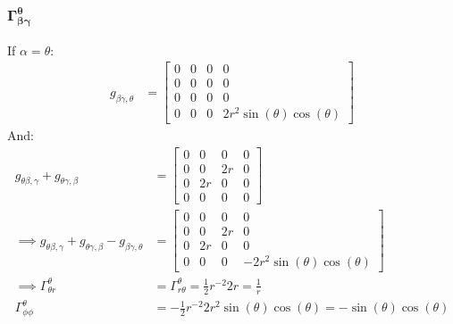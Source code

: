 \documentclass[a4paper]{article}
\begin{document}
\subsubsection{$\boldsymbol{\Gamma^\theta_{\beta \gamma}}$}
If $\alpha = \theta$:
\begin{align*}
	g_{\beta\gamma,\theta} &= \begin{bmatrix} 0 & 0  & 0 & 0 \\
				0 &0 & 0 & 0\\
				0 & 0 & 0 & 0  \\
				0 & 0 & 0 & 2r^2 \sin(\theta) \cos(\theta)
			\end{bmatrix}
\end{align*}
And:
\begin{align*}
	g_{\theta\beta , \gamma} + g_{\theta \gamma , \beta} &= \begin{bmatrix} 0 & 0 & 0 & 0 \\
		0 & 0 & 2r & 0\\
		0 & 2r & 0 & 0 \\
		0 & 0 & 0 & 0
\end{bmatrix}\\
\implies 	g_{\theta\beta , \gamma} + g_{\theta \gamma , \beta} - g_{\beta\gamma,\theta} &= \begin{bmatrix} 0 & 0 & 0 & 0 \\
	0 & 0 & 2r & 0\\
	0 & 2r & 0 & 0 \\
	0 & 0 & 0 & -2r^2 \sin(\theta) \cos(\theta)
\end{bmatrix}\\
\implies \Gamma^\theta _{\theta r} &= \Gamma^\theta _{r \theta} = \frac{1}{2} r^{-2} 2r = \frac{1}{r}\\
\Gamma^\theta _{\phi \phi} &= -\frac{1}{2} r^{-2} 2r^2\sin(\theta)\cos(\theta) = -\sin(\theta) \cos(\theta)
\end{align*}
\end{document}
